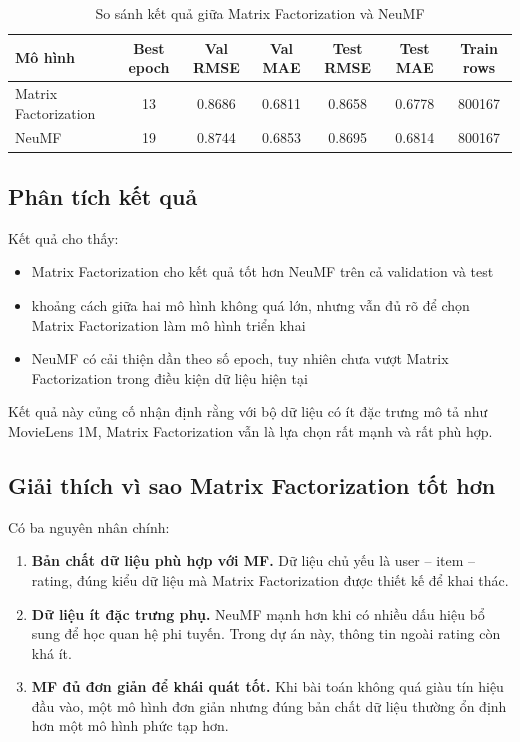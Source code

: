 \documentclass[12pt,a4paper]{article}
\begin{document}
\begin{table}[H]
\centering
\caption{So sánh kết quả giữa Matrix Factorization và NeuMF}
\small
\renewcommand{\arraystretch}{1.15}
\begin{tabular}{>{\raggedright\arraybackslash}p{3.5cm}cccccc}
\toprule
Mô hình & Best epoch & Val RMSE & Val MAE & Test RMSE & Test MAE & Train rows \\
\midrule
Matrix Factorization & 13 & 0.8686 & 0.6811 & 0.8658 & 0.6778 & 800167 \\
NeuMF & 19 & 0.8744 & 0.6853 & 0.8695 & 0.6814 & 800167 \\
\bottomrule
\end{tabular}
\normalsize
\renewcommand{\arraystretch}{1.0}
\end{table}

\subsection{Phân tích kết quả}

Kết quả cho thấy:

\begin{itemize}[leftmargin=1.5cm]
    \item Matrix Factorization cho kết quả tốt hơn NeuMF trên cả validation và test
    \item khoảng cách giữa hai mô hình không quá lớn, nhưng vẫn đủ rõ để chọn Matrix Factorization làm mô hình triển khai
    \item NeuMF có cải thiện dần theo số epoch, tuy nhiên chưa vượt Matrix Factorization trong điều kiện dữ liệu hiện tại
\end{itemize}

Kết quả này củng cố nhận định rằng với bộ dữ liệu có ít đặc trưng mô tả như MovieLens 1M, Matrix Factorization vẫn là lựa chọn rất mạnh và rất phù hợp.

\subsection{Giải thích vì sao Matrix Factorization tốt hơn}

Có ba nguyên nhân chính:

\begin{enumerate}[leftmargin=1.5cm]
    \item \textbf{Bản chất dữ liệu phù hợp với MF.} Dữ liệu chủ yếu là user -- item -- rating, đúng kiểu dữ liệu mà Matrix Factorization được thiết kế để khai thác.
    \item \textbf{Dữ liệu ít đặc trưng phụ.} NeuMF mạnh hơn khi có nhiều dấu hiệu bổ sung để học quan hệ phi tuyến. Trong dự án này, thông tin ngoài rating còn khá ít.
    \item \textbf{MF đủ đơn giản để khái quát tốt.} Khi bài toán không quá giàu tín hiệu đầu vào, một mô hình đơn giản nhưng đúng bản chất dữ liệu thường ổn định hơn một mô hình phức tạp hơn.
\end{enumerate}
\end{document}
